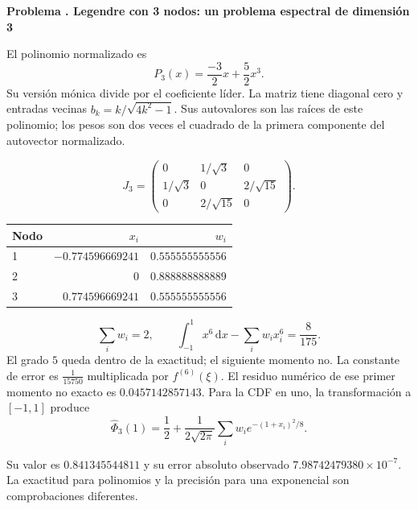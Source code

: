 \documentclass[11pt,a4paper]{article}
\newcommand{\dd}{\,\mathrm d}
\theoremstyle{definition}
\newcounter{problema}
\newenvironment{resuelto}[1]{\refstepcounter{problema}\par\medskip\Needspace{6\baselineskip}\textbf{Problema \theproblema. #1}\par}{\par\medskip}
\begin{document}
\begin{resuelto}{Legendre con 3 nodos: un problema espectral de dimensión 3}
El polinomio normalizado es
\[
P_{3}(x)=\frac{-3}{2}x+\frac{5}{2}x^{3}.
\]
Su versión mónica divide por el coeficiente líder. La matriz tiene diagonal cero y entradas vecinas $b_k=k/\sqrt{4k^2-1}$. Sus autovalores son las raíces de este polinomio; los pesos son dos veces el cuadrado de la primera componente del autovector normalizado.

\[J_{3}=\begin{pmatrix}0&1/\sqrt{3}&0\\1/\sqrt{3}&0&2/\sqrt{15}\\0&2/\sqrt{15}&0\end{pmatrix}.\]
\begin{center}\small\begin{tabular}{lrr}
\toprule
Nodo & $x_i$ & $w_i$\\\midrule
1 & $-0.774596669241$ & $0.555555555556$\\
2 & $0$ & $0.888888888889$\\
3 & $0.774596669241$ & $0.555555555556$\\
\bottomrule\end{tabular}\end{center}

\[
\sum_iw_i=2,\qquad
\int_{-1}^1x^{6}\dd x-\sum_iw_ix_i^{6}
=\frac{8}{175}.
\]
El grado $5$ queda dentro de la exactitud; el siguiente momento no. La constante de error es $\frac{1}{15750}$ multiplicada por $f^{(6)}(\xi)$. El residuo numérico de ese primer momento no exacto es $0.0457142857143$.
Para la CDF en uno, la transformación a $[-1,1]$ produce
\[
\widehat\Phi_{3}(1)=\frac12+
\frac1{2\sqrt{2\pi}}\sum_iw_i e^{-(1+x_i)^2/8}.
\]

Su valor es $0.841345544811$ y su error absoluto observado $7.98742479380\times10^{-7}$. La exactitud para polinomios y la precisión para una exponencial son comprobaciones diferentes.\end{resuelto}
\end{document}
